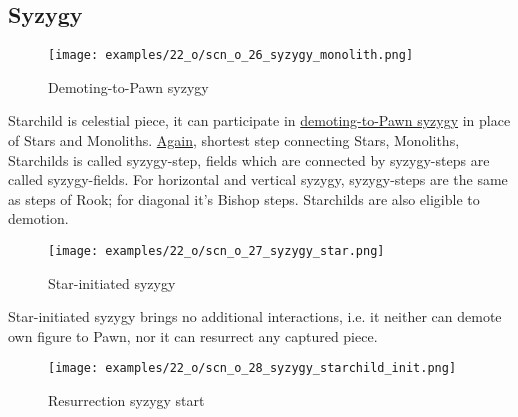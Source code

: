 \clearpage %

\subsection*{Syzygy}

\vspace*{-1.3\baselineskip}
\noindent
\begin{figure}[!h]
\texttt{[image: examples/22\_o/scn\_o\_26\_syzygy\_monolith.png]}
\caption{Demoting-to-Pawn syzygy}
\label{fig:scn_o_26_syzygy_monolith}
\end{figure}

Starchild is celestial piece, it can participate in
\hyperref[fig:scn_d_17_syzygy_2_stars_init]{demoting-to-Pawn syzygy} in place of Stars and Monoliths.
\hyperref[fig:scn_d_19_syzygy_2_monoliths_init]{Again}, shortest step connecting Stars, Monoliths,
Starchilds is called syzygy-step, fields which are connected by syzygy-steps are called syzygy-fields.
For horizontal and vertical syzygy, syzygy-steps are the same as steps of Rook; for diagonal it’s
Bishop steps. Starchilds are also eligible to demotion.

\clearpage %

\vspace*{-2.1\baselineskip}
\noindent
\begin{figure}[!h]
\texttt{[image: examples/22\_o/scn\_o\_27\_syzygy\_star.png]}
\caption{Star-initiated syzygy}
\label{fig:scn_o_27_syzygy_star}
\end{figure}

Star-initiated syzygy brings no additional interactions, i.e. it neither can demote own figure to Pawn,
nor it can resurrect any captured piece.

\clearpage %

\vspace*{-2.1\baselineskip}
\noindent
\begin{figure}[!h]
\texttt{[image: examples/22\_o/scn\_o\_28\_syzygy\_starchild\_init.png]}
\caption{Resurrection syzygy start}
\label{fig:scn_o_28_syzygy_starchild_init}
\end{figure}


